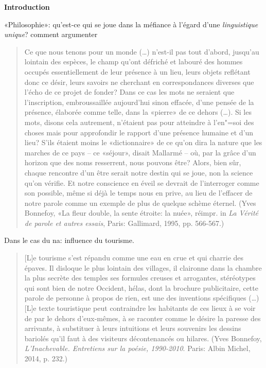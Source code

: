 {\LARGE \textbf{Introduction}}
	
«Philosophie»: qu'est-ce qui se joue dans la méfiance à l'égard d'une \textit{linguistique unique}?  comment argumenter 

\begin{quotation}
	Ce que nous tenons pour un monde ({\dots}) n'est-il pas tout d'abord, jusqu'au lointain des espèces, le champ qu'ont défriché et labouré des hommes occupés essentiellement de leur présence à un lieu, leurs objets reflétant donc ce désir, leurs savoirs ne cherchant en correspondances diverses que l'écho de ce projet de fonder? Dans ce cas les mots ne seraient que l'inscription, embroussaillée aujourd'hui sinon effacée, d'une pensée de la présence, élaborée comme telle, dans la «pierre» de ce dehors ({\dots}). Si les mots, disons cela autrement, n'étaient pas pour atteindre à l'en"=soi des choses mais pour approfondir le rapport d'une présence humaine et d'un lieu? S'ils étaient moins le «dictionnaire» de ce qu'on dira la nature que les marches de ce pays -- ce «séjour», disait Mallarmé -- où, par la grâce d'un horizon que des noms resserrent, nous pouvons être? Alors, bien sûr, chaque rencontre d'un être serait notre destin qui se joue, non la science qu'on vérifie. Et notre conscience en éveil se devrait de l'interroger comme son possible, même si déjà le temps nous en prive, au lieu de l'effacer de notre parole comme un exemple de plus de quelque schème éternel. (Yves Bonnefoy, «La fleur double, la sente étroite: la nuée», réimpr. in \textit{La Vérité de parole et autres essais}, Paris: Gallimard, 1995, pp. 566-567.)
\end{quotation}

Dans le cas du na: influence du tourisme.

\begin{quotation}
	[L]e tourisme s'est répandu comme une eau en crue et qui charrie des épaves. Il disloque le plus lointain des villages, il claironne dans la chambre la plus secrète des temples ses formules creuses et arrogantes, stéréotypes qui sont bien de notre Occident, hélas, dont la brochure publicitaire, cette parole de personne à propos de rien, est une des inventions spécifiques ({\dots}) [L]e texte touristique peut contraindre les habitants de ces lieux à se voir de par le dehors d'eux-mêmes, à se raconter comme le désire la paresse des arrivants, à substituer à leurs intuitions et leurs souvenirs les dessins bariolés qu'il faut à des visiteurs décontenancés ou hilares. (Yves Bonnefoy, \textit{L'Inachevable. Entretiens sur la poésie, 1990-2010}. Paris: Albin Michel, 2014, p. 232.)
\end{quotation}

